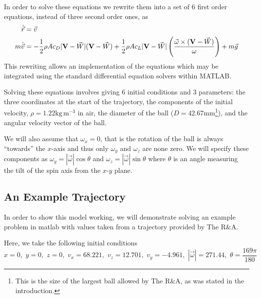 In order to solve these equations we rewrite them into a set of 6 first order equations, instead of 
three second order ones, as
\begin{subequations}
\begin{align}
\dot{\vec{r}} &= \vec{v} \\
m \dot{\vec{v}} &= - \frac{1}{2}\rho A c_D |\mathbf{V} - \vec{W}|(\mathbf{V} - \vec{W}) + \frac{1}{2} \rho A c_L
|\mathbf{V} - \vec{W}| \left(\frac{\vec{\omega} \times (\mathbf{V} - \vec{W})}{\omega}\right) + m \vec{g}
\end{align}
\end{subequations}
This rewriting allows an implementation of the equations which may be integrated using the standard
differential equation solvers within MATLAB.

Solving these equations involves giving 6 initial conditions and 3 parameters: the three coordinates at the start of
the trajectory, the components of the initial velocity, $\rho = 1.22 \text{kg}\,\text{m}^{-3}$ in air,
the diameter of the ball ($D = 42.67$mm\footnote{This is the size of the largest ball allowed by The R\&A,
as was stated in the introduction.}), and the angular velocity vector of the ball. 

We will also assume that $\omega_x = 0$, that is the rotation of the ball is always
``towards'' the $x$-axis and thus only $\omega_y$ and $\omega_z$ are none zero. We will specify these 
components as $\omega_y = |\vec{\omega}| \cos \theta$ and $\omega_z = |\vec{\omega}| \sin \theta$ where $\theta$
is an angle measuring the tilt of the spin axis from the $x$-$y$ plane.

\subsection{An Example Trajectory} \label{rr-example}

In order to show this model working, we will demonstrate solving an example problem in matlab with
values taken from a trajectory provided by The R\&A.

Here, we take the following initial conditions
\[
x = 0, \,\, y = 0, \,\, z = 0, \,\, v_x = 68.221, \,\, v_z = 12.701, \,\, v_y = -4.961, \,\, |\vec{\omega}| = 271.44, \,\, \theta = \frac{169\pi}{180}
\]


